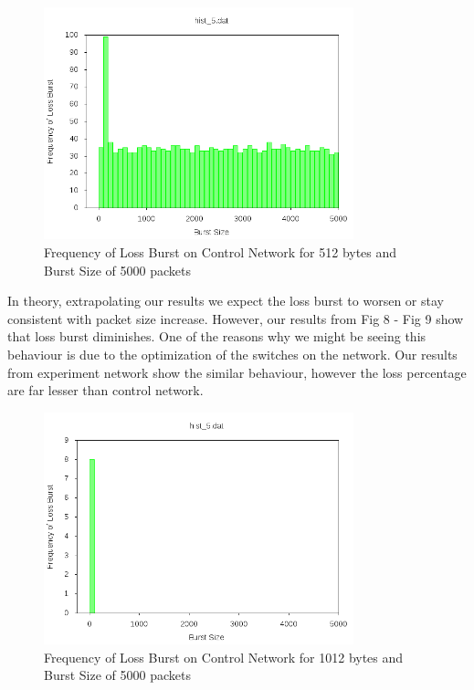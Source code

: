\documentclass[11pt]{article}
\begin{document}
\FloatBarrier
\begin{figure}[!ht]
\centering
\includegraphics[width=0.8\textwidth]{seq500.png}
\caption{Frequency of Loss Burst on Control Network for 512 bytes and Burst Size of 5000 packets}
\end{figure}
\FloatBarrier
In theory, extrapolating our results we expect the loss burst to worsen or stay consistent with packet size increase. However, our results from Fig 8 - Fig 9 show that loss burst diminishes. One of the reasons why we might be seeing this behaviour is due to the optimization of the switches on the network. Our results from experiment network show the similar behaviour, however the loss percentage are far lesser than control network.
\begin{figure}[!ht]
\centering
\includegraphics[width=0.8\textwidth]{seq1000.png}
\caption{Frequency of Loss Burst on Control Network for 1012 bytes and Burst Size of 5000 packets}
\end{figure}
\FloatBarrier
\end{document}
